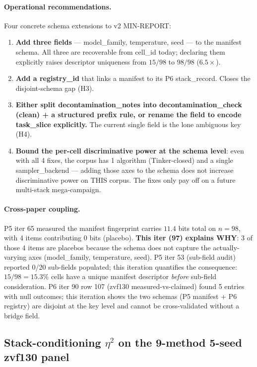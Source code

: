 \documentclass{article}  \usepackage[preprint,nonatbib]{neurips_2026} \usepackage[numbers]{natbib}
\begin{document}
\paragraph{Operational recommendations.}
Four concrete schema extensions to v2 MIN-REPORT:
\begin{enumerate}
\item \textbf{Add three fields} --- \textsf{model\_family},
\textsf{temperature}, \textsf{seed} --- to the manifest schema.
All three are recoverable from cell\_id today; declaring them
explicitly raises descriptor uniqueness from $15/98$ to $98/98$
($6.5\times$).
\item \textbf{Add a \textsf{registry\_id}} that links a manifest
to its P6 stack\_record. Closes the disjoint-schema gap (H3).
\item \textbf{Either split \textsf{decontamination\_notes} into
\textsf{decontamination\_check} (clean) + a structured prefix rule,
or rename the field to encode \textsf{task\_slice} explicitly.}
The current single field is the lone ambiguous key (H4).
\item \textbf{Bound the per-cell discriminative power at the schema
level}: even with all 4 fixes, the corpus has 1 algorithm
(Tinker-closed) and a single sampler\_backend --- adding those axes
to the schema does not increase discriminative power on THIS
corpus. The fixes only pay off on a future multi-stack
mega-campaign.
\end{enumerate}

\paragraph{Cross-paper coupling.}
P5 iter 65 measured the manifest fingerprint carries $11.4$ bits
total on $n{=}98$, with 4 items contributing 0 bits (placebo).
\textbf{This iter (97) explains WHY}: 3 of those 4 items are
placebos because the schema does not capture the actually-varying
axes (\textsf{model\_family, temperature, seed}). P5 iter 53
(sub-field audit) reported 0/20 sub-fields populated; this iteration
quantifies the consequence: $15/98 = 15.3\%$ cells have a unique
manifest descriptor \emph{before} sub-field consideration. P6 iter
90 row 107 (zvf130 measured-vs-claimed) found 5 entries with null
outcomes; this iteration shows the two schemas (P5 manifest + P6
registry) are disjoint at the key level and cannot be
cross-validated without a bridge field.
 \subsection{Stack-conditioning $\eta^2$ on the 9-method 5-seed zvf130 panel}
\label{sec:p5-iter101-zvf130-eta2}
\end{document}
